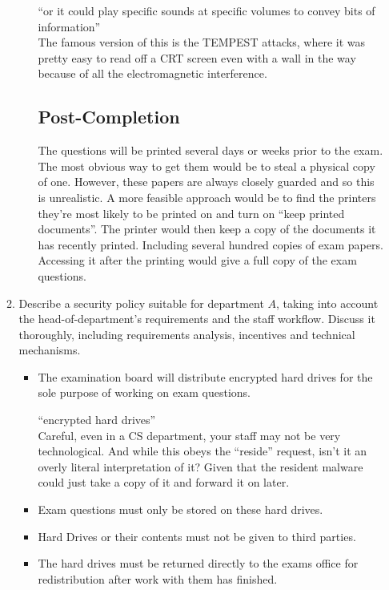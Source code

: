 \documentclass[10pt,\jkfside,a4paper]{article}
\begin{document}
\begin{enumerate}
\begin{enumerate}
\begin{enumerate}[label=(\roman*)]
{\color{blue}
``or it could play specific sounds at specific volumes to convey bits of information''\\
The famous version of this is the TEMPEST attacks, where it was pretty easy to read off a CRT screen
even with a wall in the way because of all the electromagnetic interference.
}

\subsection*{Post-Completion}

The questions will be printed several days or weeks prior to the exam. The most obvious way
to get them would be to steal a physical copy of one. However, these papers are always
closely guarded and so this is unrealistic. A more feasible approach would be to find
the printers they're most likely to be printed on and turn on ``keep printed documents''.
The printer would then keep a copy of the documents it has recently printed. Including
several hundred copies of exam papers. Accessing it after the printing would give a
full copy of the exam questions.

\end{enumerate}

\item Describe a security policy suitable for department $A$, taking into
account the head-of-department's requirements and the staff workflow.
Discuss it thoroughly, including requirements analysis, incentives and
technical mechanisms.

\begin{itemize}

\item The examination board will distribute encrypted hard drives for the sole
purpose of working on exam questions.

{\color{blue}
``encrypted hard drives''\\
Careful, even in a CS department, your staff may not be very technological. And while this obeys the
``reside'' request, isn't it an overly literal interpretation of it? Given that the resident malware
could just take a copy of it and forward it on later.
}

\item Exam questions must only be stored on these hard drives.

\item Hard Drives or their contents must not be given to third parties.

\item The hard drives must be returned directly to the exams office for
redistribution after work with them has finished.


\end{itemize}
\end{enumerate}
\end{enumerate}
\end{document}
